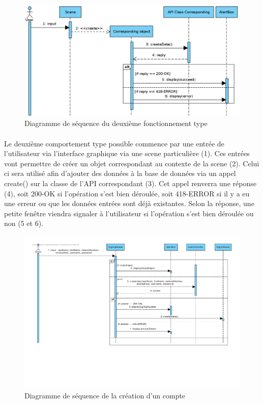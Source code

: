 \documentclass[]{article}
\begin{document}
    \begin{figure}[ht]
        \centering
        \includegraphics[scale=0.29]{img/type2.png}
        \caption{Diagramme de séquence du deuxième fonctionnement type}
        \label{fig2}
        \end{figure}

    \paragraph{}Le deuxième comportement type possible commence par une entrée de l’utilisateur via l’interface graphique via une scene particulière (1). Ces entrées vont permettre de créer un objet correspondant au contexte de la scene (2). Celui ci sera utilisé afin d’ajouter des données à la base de données via un appel create() sur la classe de l’API correspondant (3). Cet appel renverra une réponse (4), soit 200-OK si l’opération s’est bien déroulée, soit 418-ERROR si il y a eu une erreur ou que les données entrées sont déjà existantes. Selon la réponse, une petite fenêtre viendra signaler à l’utilisateur si l’opération s’est bien déroulée ou non (5 et 6).


    \newpage

    \begin{figure}[ht]
        \centering
        \includegraphics[scale=0.44]{img/createAccount.pdf}
        \caption{Diagramme de séquence de la création d'un compte}
        \label{fig3}
        \end{figure}
\end{document}
